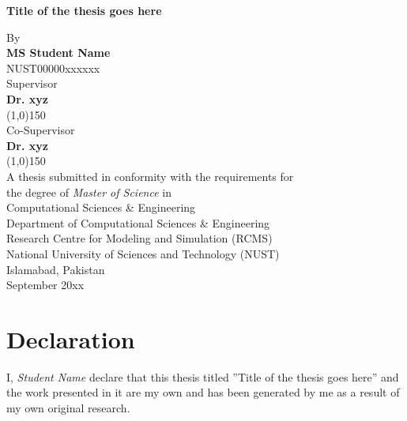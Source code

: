 \documentclass[11pt,a4paper]{report}
\numberwithin{equation}{section}
\begin{document}
    \newpage
    \begin{titlepage}
        \centering
        \huge{\textbf{Title of the thesis goes here}} \\ [0.2cm]
        \begin{figure}[ht!]
            \centering
            \def\svgwidth{0.3\columnwidth}
            
        \end{figure}
        \Large{By} \\
        \Large{\textbf{MS Student Name}} \\
        \Large{NUST00000xxxxxx} \\[0.2cm]
        \Large{Supervisor} \\
        \Large{\textbf{Dr. xyz}} \\
        \line(1,0){150} \\
        \Large{Co-Supervisor} \\
        \Large{\textbf{Dr. xyz}} \\
        \line(1,0){150} \\ [0.2cm]
        \Large{A thesis submitted in conformity with the requirements for \\
        the degree of \emph{Master of Science} in \\
        Computational Sciences \& Engineering} \\[0.2cm]
        \Large{
        Department of Computational Sciences \& Engineering \\
        Research Centre for Modeling and Simulation (RCMS) \\
        National University of Sciences and Technology (NUST) \\
        Islamabad, Pakistan} \\
        \Large{September 20xx}
    \end{titlepage}

    \newpage
    \chapter*{Declaration} %
    \label{cha:declaration}
    I, \textit{Student Name} declare that this thesis titled ''Title of the thesis goes here'' and the work presented in it are my own and has been generated by me as a result of my own original research. \\
\end{document}
